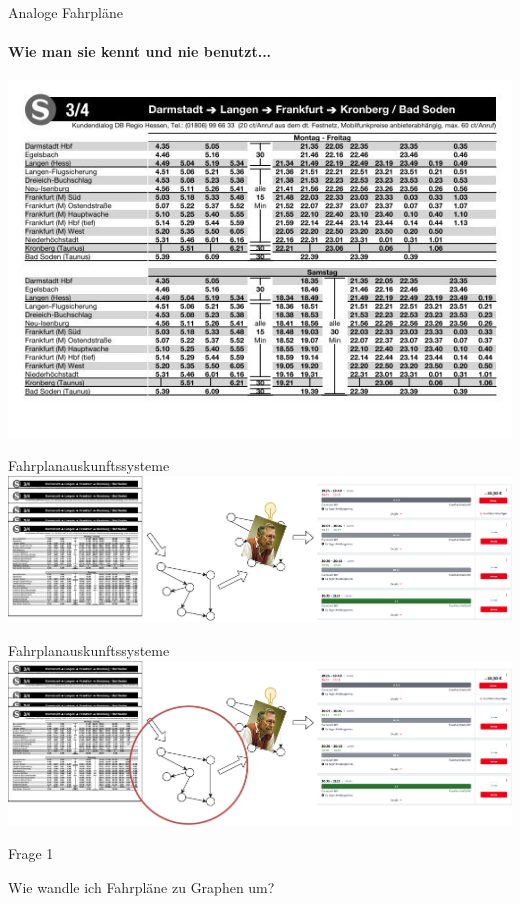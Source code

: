 \begin{frame}{Analoge Fahrpläne}
\framesubtitle{Wie man sie kennt und nie benutzt...}
	\begin{center}
		\includegraphics[width=.8\linewidth]{images/fahrplan-s3s4.jpg}
	\end{center}
\end{frame}

\begin{frame}{Fahrplanauskunftssysteme}
	\vspace{4em}
	\includegraphics[width=\linewidth]{images/fahrplan-zu-auskunftssystem.pdf}
\end{frame}
\addtocounter{framenumber}{-1}
\begin{frame}{Fahrplanauskunftssysteme}
	\vspace{3em}
	\includegraphics[width=\linewidth]{images/fahrplan-zu-auskunftssystem-2.pdf}
\end{frame}


\begin{frame}{Frage 1}
	\vspace{7em}
	\begin{center}
		\begin{Large}
			Wie wandle ich Fahrpläne zu Graphen um?
		\end{Large}
	\end{center}
\end{frame}

